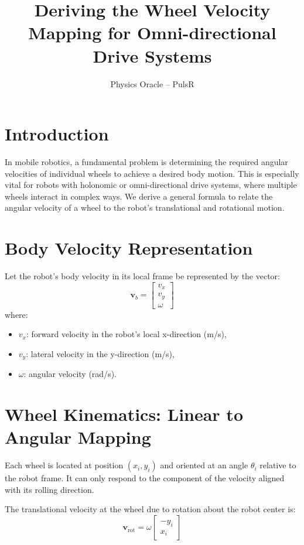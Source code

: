 \documentclass[11pt]{article}
\title{\textbf{Deriving the Wheel Velocity Mapping for Omni-directional Drive Systems}}
\author{Physics Oracle – PulsR}
\date{}
\begin{document}
\maketitle

\section{Introduction}

In mobile robotics, a fundamental problem is determining the required angular velocities of individual wheels to achieve a desired body motion. This is especially vital for robots with holonomic or omni-directional drive systems, where multiple wheels interact in complex ways. We derive a general formula to relate the angular velocity of a wheel to the robot's translational and rotational motion.

\section{Body Velocity Representation}

Let the robot's body velocity in its local frame be represented by the vector:
\[
\mathbf{v}_b = 
\begin{bmatrix}
v_x \\ v_y \\ \omega
\end{bmatrix}
\]
where:
\begin{itemize}
    \item \(v_x\): forward velocity in the robot's local x-direction (m/s),
    \item \(v_y\): lateral velocity in the y-direction (m/s),
    \item \(\omega\): angular velocity (rad/s).
\end{itemize}

\section{Wheel Kinematics: Linear to Angular Mapping}

Each wheel is located at position \((x_i, y_i)\) and oriented at an angle \(\theta_i\) relative to the robot frame. It can only respond to the component of the velocity aligned with its rolling direction.

The translational velocity at the wheel due to rotation about the robot center is:
\[
\mathbf{v}_{\text{rot}} = \omega 
\begin{bmatrix}
 -y_i \\
 x_i
\end{bmatrix}
\]
\end{document}
